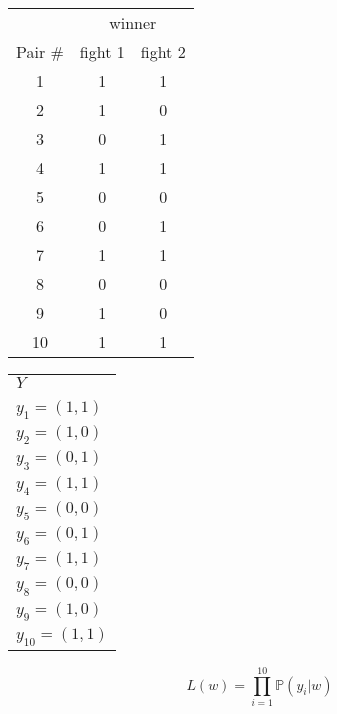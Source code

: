 \documentclass[landscape]{foils}
\renewcommand{\Pr}{\mathbb{P}}
\begin{document}
\myNewSlide
\begin{center}
\begin{tabular}{|c|c|c|}
\hline
& \multicolumn{2}{c|}{winner}\\
Pair \# & fight 1 & fight 2 \\
\hline
1 & 1 & 1  \\
\hline
2 & 1 & 0  \\
\hline
3 & 0 & 1  \\
\hline
4 & 1 & 1  \\
\hline
5 & 0 & 0  \\
\hline
6 & 0 & 1   \\
\hline
7 & 1 & 1  \\
\hline
8 & 0 & 0  \\
\hline
9 & 1 & 0  \\
\hline
10 & 1 & 1   \\
\hline
\end{tabular}
\begin{tabular}{l}
$Y$\\
\\
$y_1 = (1, 1)$   \\
$y_2 = (1, 0)$  \\
$y_3 = (0, 1)$  \\
$y_4 = (1, 1)$  \\
$y_5 = (0, 0)$  \\
$y_6 = (0, 1)$  \\
$y_7 = (1, 1)$  \\
$y_8 = (0, 0)$  \\
$y_9 = (1, 0)$  \\
$y_{10} = (1, 1)$  \\
\end{tabular}
\end{center}


$$L(w) = \prod_{i=1}^{10} \Pr(y_i|w)$$
\end{document}

